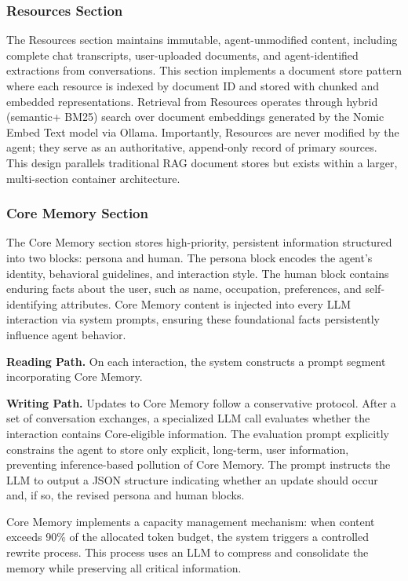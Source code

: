 ﻿\documentclass[12pt,a4paper]{article}
\begin{document}
\subsubsection{Resources Section}

The Resources section maintains immutable, agent-unmodified content, including complete chat transcripts, user-uploaded documents, and agent-identified extractions from conversations. This section implements a document store pattern where each resource is indexed by document ID and stored with chunked and embedded representations. Retrieval from Resources operates through hybrid (semantic+ BM25) search over document embeddings generated by the Nomic Embed Text model via Ollama. Importantly, Resources are never modified by the agent; they serve as an authoritative, append-only record of primary sources. This design parallels traditional RAG document stores but exists within a larger, multi-section container architecture.

\subsubsection{Core Memory Section}

The Core Memory section stores high-priority, persistent information structured into two blocks: persona and human. The persona block encodes the agent's identity, behavioral guidelines, and interaction style. The human block contains enduring facts about the user, such as name, occupation, preferences, and self-identifying attributes. Core Memory content is injected into every LLM interaction via system prompts, ensuring these foundational facts persistently influence agent behavior.

\textbf{Reading Path.} On each interaction, the system constructs a prompt segment incorporating Core Memory.

\textbf{Writing Path.} Updates to Core Memory follow a conservative protocol. After a set of conversation exchanges, a specialized LLM call evaluates whether the interaction contains Core-eligible information. The evaluation prompt explicitly constrains the agent to store only explicit, long-term, user information, preventing inference-based pollution of Core Memory. The prompt instructs the LLM to output a JSON structure indicating whether an update should occur and, if so, the revised persona and human blocks.

Core Memory implements a capacity management mechanism: when content exceeds 90\% of the allocated token budget, the system triggers a controlled rewrite process. This process uses an LLM to compress and consolidate the memory while preserving all critical information.
\end{document}
